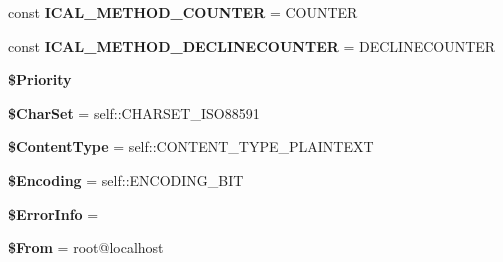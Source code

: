 \begin{DoxyCompactItemize}
\mbox{\label{classPHPMailer_1_1PHPMailer_1_1PHPMailer_af97e46e01779de967c86a3fd1aa5f310}} 
const {\bfseries I\+C\+A\+L\+\_\+\+M\+E\+T\+H\+O\+D\+\_\+\+C\+O\+U\+N\+T\+ER} = \textquotesingle{}C\+O\+U\+N\+T\+ER\textquotesingle{}
\item 
\mbox{\label{classPHPMailer_1_1PHPMailer_1_1PHPMailer_af0fcbc60327259101633f692c2b43e42}} 
const {\bfseries I\+C\+A\+L\+\_\+\+M\+E\+T\+H\+O\+D\+\_\+\+D\+E\+C\+L\+I\+N\+E\+C\+O\+U\+N\+T\+ER} = \textquotesingle{}D\+E\+C\+L\+I\+N\+E\+C\+O\+U\+N\+T\+ER\textquotesingle{}
\item 
\mbox{\label{classPHPMailer_1_1PHPMailer_1_1PHPMailer_a94075a5bc25eff13a34d738efe8a138d}} 
{\bfseries \$\+Priority}
\item 
\mbox{\label{classPHPMailer_1_1PHPMailer_1_1PHPMailer_a76753a900fbf7d967e429d6e116362b8}} 
{\bfseries \$\+Char\+Set} = self\+::\+C\+H\+A\+R\+S\+E\+T\+\_\+\+I\+S\+O88591
\item 
\mbox{\label{classPHPMailer_1_1PHPMailer_1_1PHPMailer_a0939f19b1e22b2ea084729b880cb9977}} 
{\bfseries \$\+Content\+Type} = self\+::\+C\+O\+N\+T\+E\+N\+T\+\_\+\+T\+Y\+P\+E\+\_\+\+P\+L\+A\+I\+N\+T\+E\+XT
\item 
\mbox{\label{classPHPMailer_1_1PHPMailer_1_1PHPMailer_ae3446c532e3d756993c68d02c0116d91}} 
{\bfseries \$\+Encoding} = self\+::\+E\+N\+C\+O\+D\+I\+N\+G\+\_\+B\+IT
\item 
\mbox{\label{classPHPMailer_1_1PHPMailer_1_1PHPMailer_a96eb1309859dc9b7e7b649da1ad5f188}} 
{\bfseries \$\+Error\+Info} = \textquotesingle{}\textquotesingle{}
\item 
\mbox{\label{classPHPMailer_1_1PHPMailer_1_1PHPMailer_ae34acc4d0418289f0890920d64e491ba}} 
{\bfseries \$\+From} = \textquotesingle{}root@localhost\textquotesingle{}
\item 
\mbox{\label{classPHPMailer_1_1PHPMailer_1_1PHPMailer_a622413fce9838440e140c27f9fab60be}} 

\end{DoxyCompactItemize}
